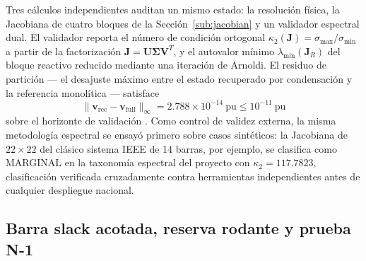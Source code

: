 Tres cálculos independientes auditan un mismo estado: la resolución física, la Jacobiana de cuatro bloques de la Sección~\ref{sub:jacobian} y un validador espectral dual. El validador reporta el número de condición ortogonal $\kappa_2(\mathbf{J}) = \sigma_{\max} / \sigma_{\min}$ a partir de la factorización $\mathbf{J} = \mathbf{U} \boldsymbol{\Sigma} \mathbf{V}^{T}$, y el autovalor mínimo $\lambda_{\min}(\mathbf{J}_R)$ del bloque reactivo reducido mediante una iteración de Arnoldi. El residuo de partición --- el desajuste máximo entre el estado recuperado por condensación y la referencia monolítica --- satisface
\begin{equation}
\|\mathbf{v}_{\mathrm{rec}} - \mathbf{v}_{\mathrm{full}}\|_\infty = 2.788 \times 10^{-14}\ \mathrm{pu} \le 10^{-11}\ \mathrm{pu}
\label{eq:trinity}
\end{equation}
sobre el horizonte de validación \cite{vancutsem1998}. Como control de validez externa, la misma metodología espectral se ensayó primero sobre casos sintéticos: la Jacobiana de $22\times22$ del clásico sistema IEEE de 14 barras, por ejemplo, se clasifica como MARGINAL en la taxonomía espectral del proyecto con $\kappa_2 = 117.7823$, clasificación verificada cruzadamente contra herramientas independientes antes de cualquier despliegue nacional.

\subsection{Barra slack acotada, reserva rodante y prueba N-1}
\label{sub:n1}

